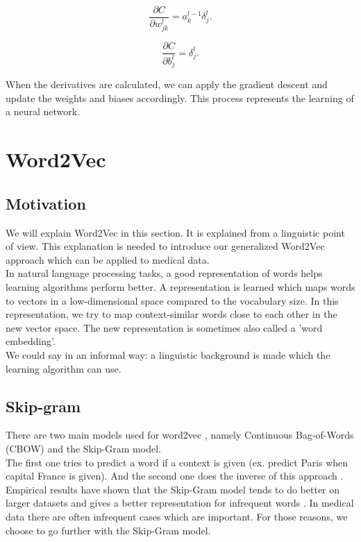 \begin{equation} 
\frac{\partial C}{\partial w^l_{jk}} = a^{l-1}_k \delta^l_j.
\end{equation}

\begin{equation} 
\frac{\partial C}{\partial b^l_j} = \delta^l_j.
\end{equation}

\noindent When the derivatives are calculated, we can apply the gradient descent and update the weights and biases accordingly. This process represents the learning of a neural network.


\section{Word2Vec}
\label{sec:word2vec}

\subsection{Motivation}

We will explain Word2Vec in this section. It is explained from a linguistic point of view. This explanation is needed to introduce our generalized Word2Vec approach which can be applied to medical data. \\

In natural language processing tasks, a good representation of words helps learning algorithms perform better. A representation is learned which maps words to vectors in a low-dimensional space compared to the vocabulary size. In this representation, we try to map context-similar words close to each other in the new vector space. The new representation is sometimes also called a 'word embedding'. \\
We could say in an informal way: a linguistic background is made which the learning algorithm can use. \\


\subsection{Skip-gram}

There are two main models used for word2vec \cite{w2vOriginal:article}, namely Continuous Bag-of-Words (CBOW) and the Skip-Gram model. \\
The first one tries to predict a word if a context is given (ex. predict Paris when capital France is given). And the second one does the inverse of this approach \cite{w2vModels:article}. Empirical results have shown that the Skip-Gram model tends to do better on larger datasets \cite{w2vReason1:online} and gives a better representation for infrequent words \cite{w2vArchive:online}. In medical data there are often infrequent cases which are important. For those reasons, we choose to go further with the Skip-Gram model. \\

